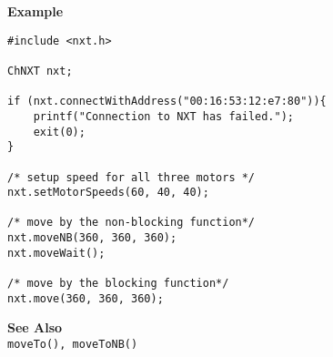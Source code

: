\noindent
{\bf Example}
\begin{lstlisting}
#include <nxt.h> 

ChNXT nxt;

if (nxt.connectWithAddress("00:16:53:12:e7:80")){
    printf("Connection to NXT has failed.");
    exit(0);
}
 
/* setup speed for all three motors */
nxt.setMotorSpeeds(60, 40, 40);

/* move by the non-blocking function*/
nxt.moveNB(360, 360, 360);
nxt.moveWait();

/* move by the blocking function*/
nxt.move(360, 360, 360);
\end{lstlisting}

\noindent
{\bf See Also}\\
{\tt moveTo(), moveToNB()}\\
